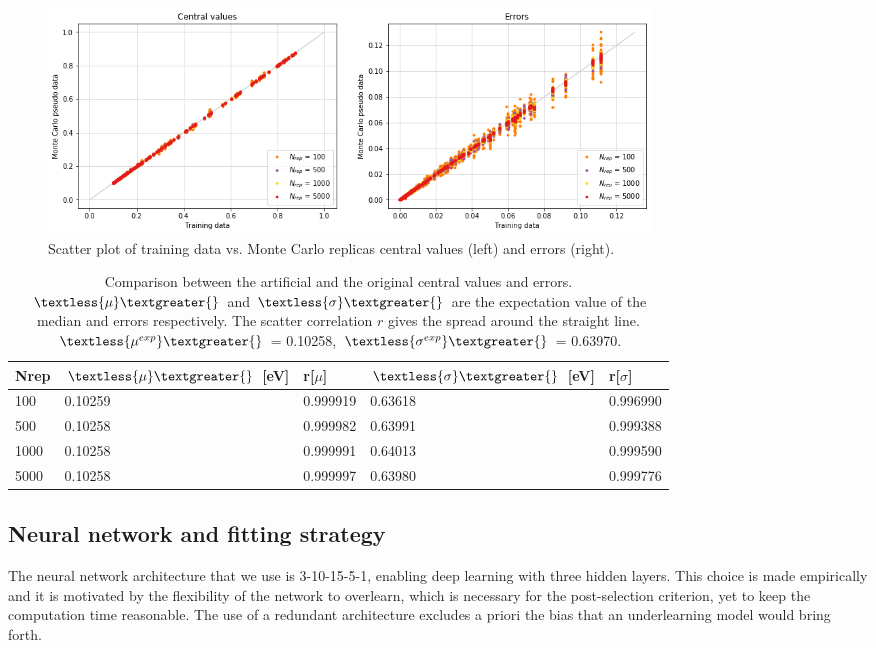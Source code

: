 \documentclass[11pt,a4paper]{article}
\numberwithin{equation}{section}
\numberwithin{figure}{section}
\numberwithin{table}{section}
\begin{document}
\begin{figure}[H]
    \centering 
    \includegraphics[width=160mm]{plots/Montecarlovacuum.png}
    \caption{Scatter plot of training data vs. Monte Carlo replicas central values (left) and errors (right). }
    \label{mcvacuum}
\end{figure}
\begin{table}[H]
\centering
\begin{tabular}{|l|ll|ll|}
\hline
Nrep & $\textless{\mu}\textgreater{}$ {[}eV{]} & r{[}$\mu${]} & $\textless{\sigma}\textgreater{}$ {[}eV{]} & r{[}$\sigma${]} \\ \hline
100  & 0.10259                           & 0.999919   & 0.63618                                  & 0.996990      \\ \hline
500  & 0.10258                              & 0.999982   & 0.63991                                  & 0.999388      \\ \hline
1000 & 0.10258                              & 0.999991   & 0.64013                                  & 0.999590      \\ \hline
5000 & 0.10258                              & 0.999997   & 0.63980                                  & 0.999776      \\ \hline
\end{tabular}
\caption{Comparison between the artificial and the original central values and errors. $\textless{\mu}\textgreater{}$ and $\textless{\sigma}\textgreater{}$ are the expectation value of the median and errors respectively. The scatter correlation $r$ gives the spread around the straight line. $\textless{\mu^{exp}}\textgreater{}$ = 0.10258, $\textless{\sigma^{exp}}\textgreater{}$ = 0.63970. }
\label{tablemcvacuum}
\end{table}


\subsection{Neural network and fitting strategy}
The neural network architecture that we use is 3-10-15-5-1, enabling deep learning with three hidden layers. This choice is made empirically and it is motivated by the flexibility of the network to overlearn, which is necessary for the post-selection criterion, yet to keep the computation time reasonable. The use of a redundant architecture excludes a priori the bias that an underlearning model would bring forth. 
\end{document}
